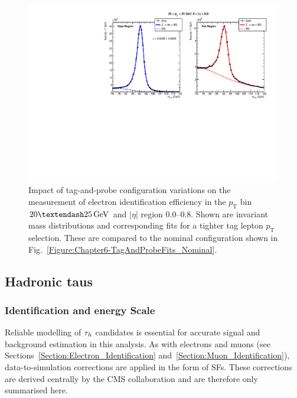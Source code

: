 \begin{figure}[!htbp]
    \centering
    \includegraphics[width=\textwidth]{Figures/Chapter6/data_id_pt_20_to_25_eta_0.0_to_0.8_tpzee_tightTag.pdf}
    \caption[Impact of tag-and-probe configuration variations on efficiency extraction.]{Impact of tag-and-probe configuration variations on the measurement of electron identification efficiency in the $p_{\mathrm{T}}$ bin $20–25\GeV$ and $|\eta|$ region 0.0–0.8. Shown are invariant mass distributions and corresponding fits for a tighter tag lepton $p_\text{T}$ selection. These are compared to the nominal configuration shown in Fig.~\ref{Figure:Chapter6-TagAndProbeFits_Nominal}.}
    \label{Figure:Chapter6-TagAndProbeFits_Alternative}
\end{figure}

\subsection{Hadronic taus}

\subsubsection{Identification and energy Scale}
\label{Section:Chapter6_Tau_ID_ES}

Reliable modelling of $\tau_h$ candidates is essential for accurate signal and background estimation in this analysis. As with electrons and muons (see Sections~\ref{Section:Electron_Identification} and~\ref{Section:Muon_Identification}), data-to-simulation corrections are applied in the form of SFs. These corrections are derived centrally by the CMS collaboration and are therefore only summarised here.

